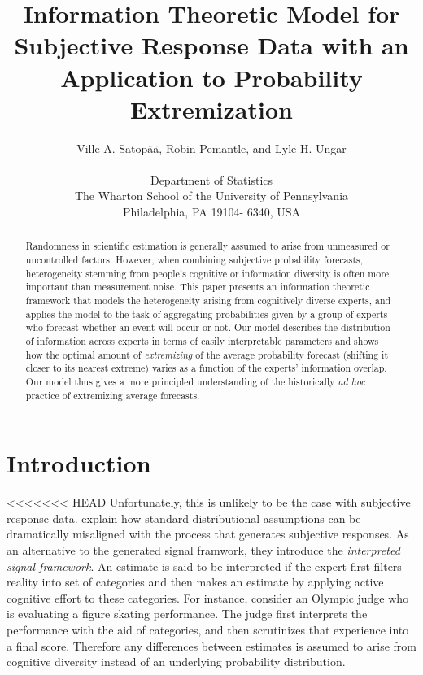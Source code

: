 \documentclass[11pt,twoside]{article}
\begin{document}
\title{Information Theoretic Model for Subjective Response Data with an Application to Probability Extremization}
\author{
Ville A. Satop\"a\"a, Robin Pemantle, and Lyle H. Ungar\\
\\
 \small Department of Statistics\\
 \small The Wharton School of the University of Pennsylvania\\
 \small Philadelphia, PA 19104- 6340, USA\\ [-0.25in]} \date{}
\maketitle

\pagestyle{myheadings}
\thispagestyle{empty}

\begin{abstract}
Randomness in scientific estimation is generally assumed to arise from
unmeasured or uncontrolled factors. However, when combining subjective probability forecasts, heterogeneity
stemming from people's cognitive or information diversity is often
more important than measurement noise.  This paper presents an
information theoretic framework that models the heterogeneity arising
from cognitively diverse experts, and applies the model to the task of
aggregating probabilities given by a group of experts who forecast
whether an event will occur or not. Our model describes the
distribution of information across experts in terms of easily
interpretable parameters and shows how the optimal amount
of \textit{extremizing} of the average probability forecast (shifting
it closer to its nearest extreme) varies as a function of the experts'
information overlap.  Our model thus gives a more principled
understanding of the historically {\it ad hoc} practice of extremizing
average forecasts.
\end{abstract}



\section{Introduction}

<<<<<<< HEAD
Unfortunately, this is unlikely to be the case with subjective response data. \cite{hong2009interpreted} explain how standard distributional assumptions can be dramatically misaligned  with the process that generates subjective responses. As an alternative to the generated signal framwork, they introduce the  \textit{interpreted signal framework}. An estimate is said to be interpreted if the expert first filters reality into set of categories and then makes an estimate by applying active cognitive effort to these categories. For instance, consider an Olympic judge who is evaluating a figure skating performance. The judge first interprets the performance with the aid of categories, and then scrutinizes that experience into a final score. Therefore any differences between estimates is assumed to arise from cognitive diversity instead of an underlying probability distribution.
\end{document}
